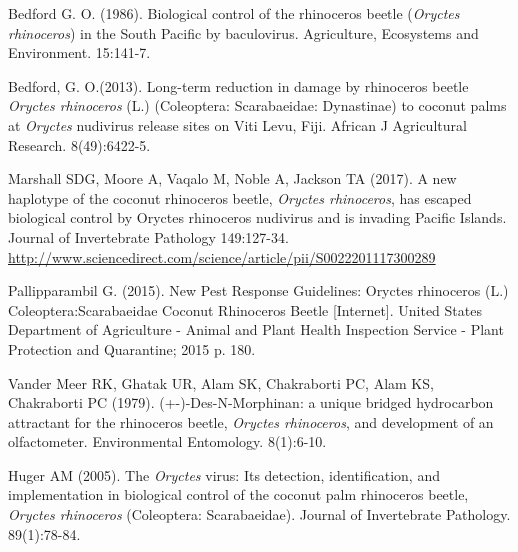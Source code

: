 \documentclass[11pt,english,letterpaper]{scrartcl}
\begin{document}
\begingroup
\renewcommand{\section}[2]{}%
\begin{thebibliography}{1}
	
 Bedford G. O. (1986). Biological control of the rhinoceros beetle (\textit{Oryctes rhinoceros}) in the South Pacific by baculovirus. Agriculture, Ecosystems and Environment. 15:141-7.

 Bedford, G. O.(2013). Long-term reduction in damage by rhinoceros beetle \textit{Oryctes rhinoceros} (L.) (Coleoptera: Scarabaeidae: Dynastinae) to coconut palms at \textit{Oryctes} nudivirus release sites on Viti Levu, Fiji. African J Agricultural Research. 8(49):6422-5. 

 Marshall SDG, Moore A, Vaqalo M, Noble A, Jackson TA (2017). A new haplotype of the coconut rhinoceros beetle, \textit{Oryctes rhinoceros}, has escaped biological control by Oryctes rhinoceros nudivirus and is invading Pacific Islands. Journal of Invertebrate Pathology 149:127-34. 
\url{ http://www.sciencedirect.com/science/article/pii/S0022201117300289}

 Pallipparambil G. (2015). New Pest Response Guidelines: Oryctes rhinoceros (L.) Coleoptera:Scarabaeidae Coconut Rhinoceros Beetle [Internet]. United States Department of Agriculture - Animal and Plant Health Inspection Service - Plant Protection and Quarantine; 2015 p. 180.

 Vander Meer RK, Ghatak UR, Alam SK, Chakraborti PC, Alam KS, Chakraborti PC (1979). (+-)-Des-N-Morphinan: a unique bridged hydrocarbon attractant for the rhinoceros beetle, \textit{Oryctes rhinoceros}, and development of an olfactometer. Environmental Entomology. 8(1):6-10. 

 Huger AM (2005). The \textit{Oryctes} virus: Its detection, identification, and implementation in biological control of the coconut palm rhinoceros beetle, \textit{Oryctes rhinoceros} (Coleoptera: Scarabaeidae). Journal of Invertebrate Pathology. 89(1):78-84.

\end{thebibliography}
\endgroup
\end{document}
